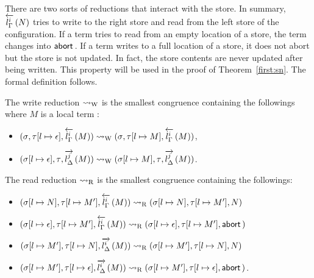{There are two sorts of reductions that interact with the store.
In summary, $\rtol i l \Gamma N$ tries to write to the right store and read from
the left store of the configuration.
If a term tries to read from an empty location of a store,
the term changes into $\abort$.  If a term writes to a full location of
a store, it does not abort but the store is not updated.  In fact, the
store contents are never updated after being written.
This property will be used in the proof of Theorem~\ref{first:sn}.
The formal definition follows.
\begin{definition}
 The write reduction $\wreduce$ is the smallest congruence
 containing the followings where $M$ is a local term :
 \begin{itemize}
  \item $\conf{}{[l\mapsto\epsilon]}{\rtol i l \Gamma M}
	\wreduce
	\conf{}{[l\mapsto M]}{\rtol i l \Gamma M}
	$\enspace,
  \item $\conf{[l\mapsto\epsilon]}{}{\ltor j l \Delta M}
	\wreduce
	\conf{[l\mapsto M]}{}{\ltor j l \Delta M}
	$\enspace.
 \end{itemize}
\end{definition}

\begin{definition}
 \label{read}
 The read reduction $\rreduce$ is the smallest congruence
 containing the
 followings:
\begin{itemize}
 \item  $\conf{[l\mapsto {N}]}{[l\mapsto M']}{\rtol i l\Gamma M}\rreduce
	\conf{[l\mapsto {N}]}{[l\mapsto M']}{N}$
 \item  $\conf{[l\mapsto \epsilon]}
	{[l\mapsto M']}{\rtol i l\Gamma M}\rreduce
	\conf{[l\mapsto \epsilon]}{[l\mapsto M']}{\abort}$
 \item  $\conf{[l\mapsto M']}{[l\mapsto {N}]}{\ltor i l \Delta M}\rreduce
	\conf{[l\mapsto M']}{[l\mapsto {N}]}{N}$
 \item  $\conf{[l\mapsto M']}{[l\mapsto \epsilon]}{\ltor i l \Delta M}\rreduce
	 \conf{[l\mapsto M']}{[l\mapsto \epsilon]}{\abort}$\enspace .
\end{itemize}
\end{definition}

}
